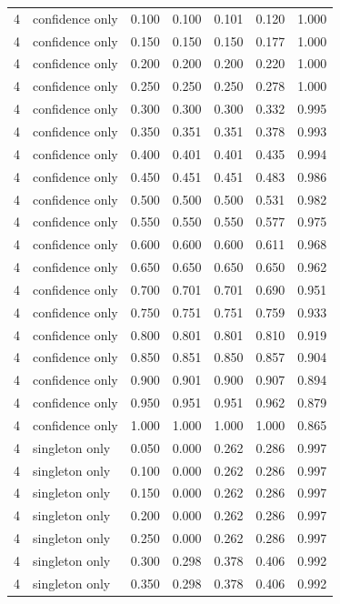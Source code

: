 \begin{tabular}{rlrrrrr}
4 & confidence only & 0.100 & 0.100 & 0.101 & 0.120 & 1.000 \\
4 & confidence only & 0.150 & 0.150 & 0.150 & 0.177 & 1.000 \\
4 & confidence only & 0.200 & 0.200 & 0.200 & 0.220 & 1.000 \\
4 & confidence only & 0.250 & 0.250 & 0.250 & 0.278 & 1.000 \\
4 & confidence only & 0.300 & 0.300 & 0.300 & 0.332 & 0.995 \\
4 & confidence only & 0.350 & 0.351 & 0.351 & 0.378 & 0.993 \\
4 & confidence only & 0.400 & 0.401 & 0.401 & 0.435 & 0.994 \\
4 & confidence only & 0.450 & 0.451 & 0.451 & 0.483 & 0.986 \\
4 & confidence only & 0.500 & 0.500 & 0.500 & 0.531 & 0.982 \\
4 & confidence only & 0.550 & 0.550 & 0.550 & 0.577 & 0.975 \\
4 & confidence only & 0.600 & 0.600 & 0.600 & 0.611 & 0.968 \\
4 & confidence only & 0.650 & 0.650 & 0.650 & 0.650 & 0.962 \\
4 & confidence only & 0.700 & 0.701 & 0.701 & 0.690 & 0.951 \\
4 & confidence only & 0.750 & 0.751 & 0.751 & 0.759 & 0.933 \\
4 & confidence only & 0.800 & 0.801 & 0.801 & 0.810 & 0.919 \\
4 & confidence only & 0.850 & 0.851 & 0.850 & 0.857 & 0.904 \\
4 & confidence only & 0.900 & 0.901 & 0.900 & 0.907 & 0.894 \\
4 & confidence only & 0.950 & 0.951 & 0.951 & 0.962 & 0.879 \\
4 & confidence only & 1.000 & 1.000 & 1.000 & 1.000 & 0.865 \\
4 & singleton only & 0.050 & 0.000 & 0.262 & 0.286 & 0.997 \\
4 & singleton only & 0.100 & 0.000 & 0.262 & 0.286 & 0.997 \\
4 & singleton only & 0.150 & 0.000 & 0.262 & 0.286 & 0.997 \\
4 & singleton only & 0.200 & 0.000 & 0.262 & 0.286 & 0.997 \\
4 & singleton only & 0.250 & 0.000 & 0.262 & 0.286 & 0.997 \\
4 & singleton only & 0.300 & 0.298 & 0.378 & 0.406 & 0.992 \\
4 & singleton only & 0.350 & 0.298 & 0.378 & 0.406 & 0.992 \\

\end{tabular}
